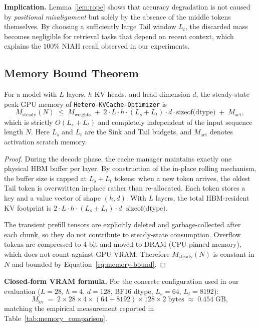 \textbf{Implication.}  Lemma~\ref{lem:rope} shows that accuracy degradation is
not caused by \textit{positional misalignment} but solely by the absence of the
middle tokens themselves.  By choosing a sufficiently large Tail window $L_t$,
the discarded mass becomes negligible for retrieval tasks that depend on
recent context, which explains the $100\%$ NIAH recall observed in our
experiments.

\subsection{Memory Bound Theorem}
\label{subsec:memory-bound}

\begin{theorem}
\label{thm:memory}
For a model with $L$ layers, $h$ KV heads, and head dimension $d$,
the steady-state peak GPU memory of \texttt{Hetero-KVCache-Optimizer} is
\begin{equation}
M_{\text{steady}}(N) \;\le\;
M_{\text{weights}} \;+\;
2 \cdot L \cdot h \cdot (L_s + L_t) \cdot d \cdot \text{sizeof(dtype)}
\;+\; M_{\text{act}},
\label{eq:memory-bound}
\end{equation}
which is strictly $O(L_s + L_t)$ and completely independent of the input
sequence length $N$.  Here $L_s$ and $L_t$ are the Sink and Tail budgets, and
$M_{\text{act}}$ denotes activation scratch memory.
\end{theorem}

\begin{proof}
During the decode phase, the cache manager maintains exactly one physical
HBM buffer per layer.  By construction of the in-place rolling mechanism,
the buffer size is capped at $L_s + L_t$ tokens; when a new token arrives,
the oldest Tail token is overwritten in-place rather than re-allocated.
Each token stores a key and a value vector of shape $(h, d)$.
With $L$ layers, the total HBM-resident KV footprint is
$2 \cdot L \cdot h \cdot (L_s + L_t) \cdot d \cdot \text{sizeof(dtype)}$.

The transient prefill tensors are explicitly deleted and garbage-collected
after each chunk, so they do not contribute to steady-state consumption.
Overflow tokens are compressed to 4-bit and moved to DRAM (CPU pinned memory),
which does not count against GPU VRAM.  Therefore $M_{\text{steady}}(N)$
is constant in $N$ and bounded by Equation~\eqref{eq:memory-bound}.
\end{proof}

\textbf{Closed-form VRAM formula.}  For the concrete configuration used in our
evaluation ($L=28$, $h=4$, $d=128$, BF16 dtype, $L_s=64$, $L_t=8192$):
\begin{equation}
M_{\text{kv}} \;=\;
2 \times 28 \times 4 \times (64 + 8192) \times 128 \times 2\;\text{bytes}
\;\approx\; 0.454\;\text{GB},
\end{equation}
matching the empirical measurement reported in Table~\ref{tab:memory_comparison}.

